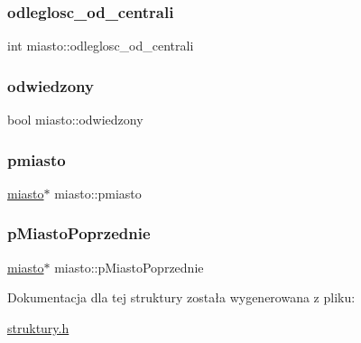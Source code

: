 \subsubsection{\texorpdfstring{odleglosc\+\_\+od\+\_\+centrali}{odleglosc\_od\_centrali}}
{\footnotesize\ttfamily int miasto\+::odleglosc\+\_\+od\+\_\+centrali}

\mbox{\label{structmiasto_a7a2028174edb36e184c06d084d02ef27}} 
\subsubsection{\texorpdfstring{odwiedzony}{odwiedzony}}
{\footnotesize\ttfamily bool miasto\+::odwiedzony}

\mbox{\label{structmiasto_a9cd7b8d4e3e00ba833d3149b76a918f9}} 
\subsubsection{\texorpdfstring{pmiasto}{pmiasto}}
{\footnotesize\ttfamily \mbox{\hyperlink{structmiasto}{miasto}}$\ast$ miasto\+::pmiasto}

\mbox{\label{structmiasto_a8238eaa6785b35e180170ae00996e515}} 
\subsubsection{\texorpdfstring{p\+Miasto\+Poprzednie}{pMiastoPoprzednie}}
{\footnotesize\ttfamily \mbox{\hyperlink{structmiasto}{miasto}}$\ast$ miasto\+::p\+Miasto\+Poprzednie}



Dokumentacja dla tej struktury została wygenerowana z pliku\+:\begin{DoxyCompactItemize}
\item 
\mbox{\hyperlink{struktury_8h}{struktury.\+h}}\end{DoxyCompactItemize}
